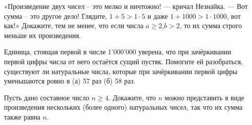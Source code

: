 ﻿
\begin{itemize}

\itA «Произведение двух чисел – это мелко и ничтожно! — кричал Незнайка. — Вот сумма – это другое дело! Глядите, $1+5 > 1 \cdot 5$ и даже $1+1000 > 1 \cdot 1000$, вот как!» Докажите, тем не менее, что если числа $a \ge 2$,\linebreak $b > 2$, то их сумма строго меньше их произведения.

\itB Единица, стоящая первой в числе 1'000'000 уверена, что при зачёркивании первой цифры числа от него остаётся сущий пустяк. Помогите ей разобраться, существуют ли натуральные числа, которые при зачёркивании первой цифры уменьшаются ровно в (а) 57 раз (б) 58 раз.

\itC Пусть дано составное число $n \geq 4$. Докажите, что $n$ можно представить в виде произведения нескольких (более одного) натуральных чисел, так что их сумма также равна $n$.
\end{itemize}